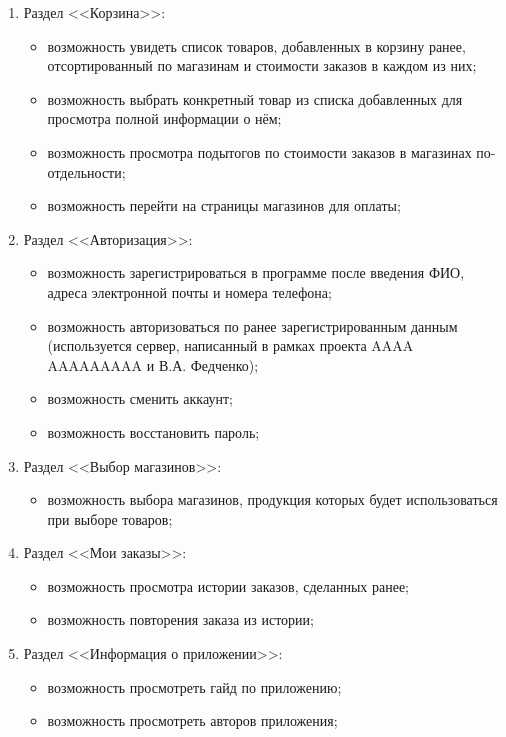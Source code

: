 \documentclass[a4paper,12pt,reqno]{article}
\begin{document}
\begin{enumerate}
    \item Раздел <<Корзина>>:
    \begin{itemize}
      \item возможность увидеть список товаров, добавленных в корзину ранее, отсортированный по магазинам и стоимости заказов в каждом из них;
      \item возможность выбрать конкретный товар из списка добавленных для просмотра полной информации о нём;
      \item возможность просмотра подытогов по стоимости заказов в магазинах по-отдельности;
      \item возможность перейти на страницы магазинов для оплаты;
    \end{itemize}
    \item Раздел <<Авторизация>>:
    \begin{itemize}
      \item возможность зарегистрироваться в программе после введения ФИО, адреса электронной почты и номера телефона;
      \item возможность авторизоваться по ранее зарегистрированным данным (используется сервер, написанный в рамках проекта AAAA AAAAAAAAA и В.А. Федченко);
      \item возможность сменить аккаунт;
      \item возможность восстановить пароль;
    \end{itemize}
    \item Раздел <<Выбор магазинов>>:
    \begin{itemize}
      \item возможность выбора магазинов, продукция которых будет использоваться при выборе товаров;
    \end{itemize}
    \item Раздел <<Мои заказы>>:
    \begin{itemize}
      \item возможность просмотра истории заказов, сделанных ранее;
      \item возможность повторения заказа из истории;
    \end{itemize}
    \item Раздел <<Информация о приложении>>:
    \begin{itemize}
      \item возможность просмотреть гайд по приложению;
      \item возможность просмотреть авторов приложения;
    \end{itemize}
  \end{enumerate}
\end{document}
